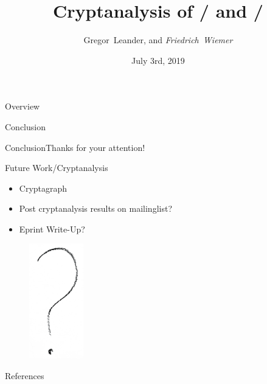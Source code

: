 \documentclass[%
    10pt,
    professionalfont,
    aspectratio=169,
]{beamer}
\title{Cryptanalysis of \clyde/ and \shadow/}
\subtitle{}
\author[Friedrich~Wiemer]{Gregor~Leander, and \emph{Friedrich~Wiemer}}
\institute{%
    Horst Görtz Institut für IT Sicherheit, Ruhr-Universität Bochum
}
\date{July 3rd, 2019}
\begin{document}
\begin{frame}[plain]
    \titlepage{}
\end{frame}

\begin{frame}{Overview}
    \tableofcontents{}
\end{frame}





\begin{frame}[plain]
    \centering
    \Huge
    Conclusion
    \vfill
\end{frame}
\begin{frame}{Conclusion}{Thanks for your attention!}
    \centering
    \begin{minipage}{0.5\textwidth}
    \begin{block}{Future Work/Cryptanalysis}
        \begin{itemize}
            \item Cryptagraph~\cite{ToSC:HalVej18}
            \item Post cryptanalysis results on mailinglist?
            \item Eprint Write-Up?
        \end{itemize}
    \end{block}
    \end{minipage}
    \begin{minipage}{0.45\textwidth}
        \centering
        \begin{figure}[!htb]
            \includegraphics[height=50mm]{data/flickr/questionmark.png}
        \end{figure}
    \end{minipage}
\end{frame}

\begin{frame}[allowframebreaks]{References}
    \tiny
    \printbibliography{}
\end{frame}
\end{document}
